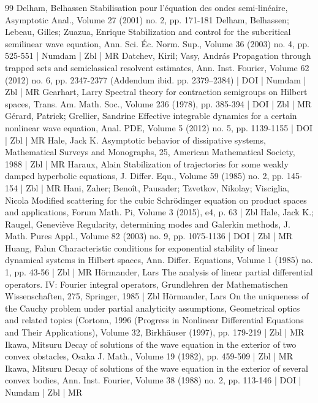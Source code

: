 \documentclass[10pt]{amsart}
\theoremstyle{definition}\newtheorem{defi}[theo]{Definition}\newtheorem{rema}[theo]{Remark}\newtheorem{exam}[theo]{Example}\newtheorem{exem}[theo]{Example}\newtheorem{nota}[theo]{Notation}
\begin{document}
\begin{thebibliography}{99}
Delham, Belhassen Stabilisation pour l’équation des ondes semi-linéaire, Asymptotic Anal., Volume 27 (2001) no. 2, pp. 171-181
Delham, Belhassen; Lebeau, Gilles; Zuazua, Enrique Stabilization and control for the subcritical semilinear wave equation, Ann. Sci. Éc. Norm. Sup., Volume 36 (2003) no. 4, pp. 525-551 | Numdam | Zbl | MR
Datchev, Kiril; Vasy, András Propagation through trapped sets and semiclassical resolvent estimates, Ann. Inst. Fourier, Volume 62 (2012) no. 6, pp. 2347-2377 (Addendum ibid. pp. 2379–2384) | DOI | Numdam | Zbl | MR
Gearhart, Larry Spectral theory for contraction semigroups on Hilbert spaces, Trans. Am. Math. Soc., Volume 236 (1978), pp. 385-394 | DOI | Zbl | MR
Gérard, Patrick; Grellier, Sandrine Effective integrable dynamics for a certain nonlinear wave equation, Anal. PDE, Volume 5 (2012) no. 5, pp. 1139-1155 | DOI | Zbl | MR
Hale, Jack K. Asymptotic behavior of dissipative systems, Mathematical Surveys and Monographs, 25, American Mathematical Society, 1988 | Zbl | MR
Haraux, Alain Stabilization of trajectories for some weakly damped hyperbolic equations, J. Differ. Equ., Volume 59 (1985) no. 2, pp. 145-154 | Zbl | MR
Hani, Zaher; Benoît, Pausader; Tzvetkov, Nikolay; Visciglia, Nicola Modified scattering for the cubic Schrödinger equation on product spaces and applications, Forum Math. Pi, Volume 3 (2015), e4, p. 63 | Zbl
Hale, Jack K.; Raugel, Geneviève Regularity, determining modes and Galerkin methods, J. Math. Pures Appl., Volume 82 (2003) no. 9, pp. 1075-1136 | DOI | Zbl | MR
Huang, Falun Characteristic conditions for exponential stability of linear dynamical systems in Hilbert spaces, Ann. Differ. Equations, Volume 1 (1985) no. 1, pp. 43-56 | Zbl | MR
Hörmander, Lars The analysis of linear partial differential operators. IV: Fourier integral operators, Grundlehren der Mathematischen Wissenschaften, 275, Springer, 1985 | Zbl
Hörmander, Lars On the uniqueness of the Cauchy problem under partial analyticity assumptions, Geometrical optics and related topics (Cortona, 1996 (Progress in Nonlinear Differential Equations and Their Applications), Volume 32, Birkhäuser (1997), pp. 179-219 | Zbl | MR
Ikawa, Mitsuru Decay of solutions of the wave equation in the exterior of two convex obstacles, Osaka J. Math., Volume 19 (1982), pp. 459-509 | Zbl | MR
Ikawa, Mitsuru Decay of solutions of the wave equation in the exterior of several convex bodies, Ann. Inst. Fourier, Volume 38 (1988) no. 2, pp. 113-146 | DOI | Numdam | Zbl | MR

\end{thebibliography}
\end{document}
